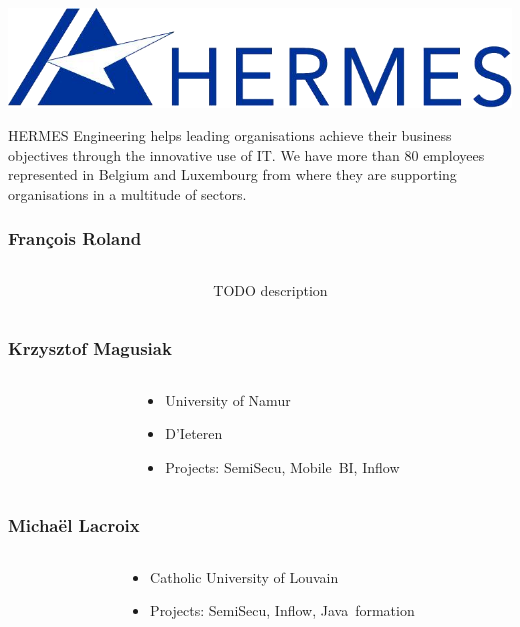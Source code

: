 \begin{frame}
\includegraphics[keepaspectratio,width=0.6\linewidth]{img/hermes}
\vspace{1cm}\par
HERMES Engineering helps leading organisations achieve their business
objectives through the innovative use of IT. We have more than 80 employees
represented in Belgium and Luxembourg from where they are supporting
organisations in a multitude of sectors.
\end{frame}

\begin{frame}
\frametitle{François Roland}
\begin{columns}
\begin{column}{0.4\linewidth}
\end{column}
\begin{column}{0.6\linewidth}
TODO description
\end{column}
\end{columns}
\end{frame}

\begin{frame}
\frametitle{Krzysztof Magusiak}
\begin{columns}
\begin{column}{0.4\linewidth}
\end{column}
\begin{column}{0.6\linewidth}
\begin{itemize}
\item University of Namur
\item D'Ieteren
\item Projects: SemiSecu, Mobile~BI, Inflow
\end{itemize}
\end{column}
\end{columns}
\end{frame}

\begin{frame}
\frametitle{Michaël Lacroix}
\begin{columns}
\begin{column}{0.4\linewidth}
\end{column}
\begin{column}{0.6\linewidth}
\begin{itemize}
\item Catholic University of Louvain
\item Projects: SemiSecu, Inflow, Java~formation
\end{itemize}
\end{column}
\end{columns}
\end{frame}

